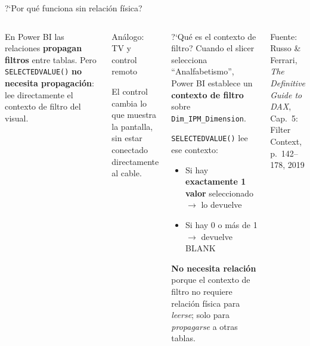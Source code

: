 \documentclass[aspectratio=169,10pt]{beamer}
\newcommand{\src}[1]{{\tiny\color{gray}Fuente: #1}}
\begin{document}
\begin{frame}{?`Por qu\'e funciona sin relaci\'on f\'isica?}

\begin{columns}[T]


En Power BI las relaciones \textbf{propagan filtros} entre tablas.
Pero \texttt{SELECTEDVALUE()} \textbf{no necesita propagaci\'on}:
lee directamente el contexto de filtro del visual.

\bigskip
\begin{block}{An\'alogo: TV y control remoto}
\begin{center}
\end{center}
El control cambia lo que muestra la pantalla,\\
sin estar conectado directamente al cable.
\end{block}


\begin{alertblock}{?`Qu\'e es el contexto de filtro?}
Cuando el slicer selecciona ``Analfabetismo'',
Power BI establece un \textbf{contexto de filtro}
sobre \texttt{Dim\_IPM\_Dimension}.

\bigskip
\texttt{SELECTEDVALUE()} lee ese contexto:
\begin{itemize}\footnotesize
  \item Si hay \textbf{exactamente 1 valor} seleccionado $\to$ lo devuelve
  \item Si hay 0 o m\'as de 1 $\to$ devuelve BLANK
\end{itemize}

\bigskip
\textbf{No necesita relaci\'on} porque el contexto
de filtro no requiere relaci\'on f\'isica para
\emph{leerse}; solo para \emph{propagarse} a otras tablas.
\end{alertblock}

\bigskip
\src{Russo \& Ferrari, \textit{The Definitive Guide to DAX},\\Cap.~5: Filter Context, p.~142--178, 2019}

\end{columns}

\end{frame}
\end{document}
